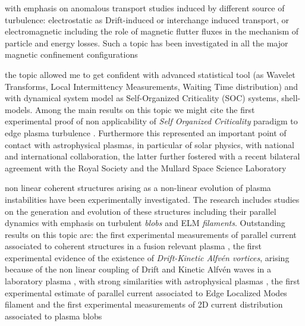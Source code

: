 \begin{description}[labelindent=0.5pt, labelsep*=0.4em, leftmargin=!, itemsep=0.05ex]
\item[(a) Multiscale Electromagnetic turbulence and induced transport:] with
emphasis on anomalous transport studies induced by different source of
turbulence: electrostatic as Drift-induced or interchange induced
transport, or electromagnetic including the role of magnetic flutter fluxes
in the mechanism of particle and energy losses. Such a topic has been
investigated in all the major magnetic confinement configurations \cite{Vianello:2002p3579, Vianello:2017ku}
\item[(b) Statistical analysis of plasma turbulence:] the topic
allowed me to get confident with advanced statistical tool (as Wavelet Transforms, Local Intermittency
  Measurements, Waiting Time distribution) and with dynamical system
  model as Self-Organized Criticality (SOC) systems,
  shell-models. Among the main results on this topic we might cite the
  first experimental proof of non applicability of \emph{Self
    Organized Criticality} paradigm to edge plasma
  turbulence \cite{Spada:2001p3574,Antoni:2001p3221}. Furthermore this represented an important point of
  contact with astrophysical plasmas, in particular of solar physics,
  with national and international collaboration, the latter further
  fostered with a recent bilateral agreement with the Royal Society
  and the Mullard Space Science Laboratory
\item[(c) Blobs and ELM filaments:] non linear coherent structures
arising as a non-linear evolution of plasma
instabilities have been experimentally investigated. The research
includes studies on the generation and evolution of these
structures including
their parallel dynamics with emphasis on turbulent \emph{blobs} and
ELM \emph{filaments}. Outstanding results on this topic are: the first experimental measurements of parallel current associated
   to coherent structures in a fusion relevant
   plasma \cite{Spolaore:2009p4115},   the first experimental evidence of the existence of  \emph{Drift-Kinetic Alfv\'en
    vortices}, arising because of the non linear coupling of Drift and
  Kinetic Alfv\'en waves in a laboratory plasma
  \cite{Vianello:2010p4670}, with strong similarities with
  astrophysical plasmas \cite{Martines:2009p4483}, the first experimental estimate of parallel current associated to
   Edge Localized Modes filament \cite{PhysRevLett.106.125002} and the
   first experimental measurements of 2D current distribution
associated to plasma blobs \cite{Furno:2011cs}

\end{description}
